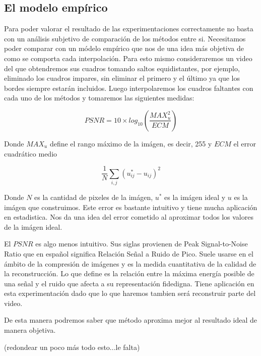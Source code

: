 \subsection{El modelo empírico}

Para poder valorar el resultado de las experimentaciones correctamente no basta con un análisis subjetivo de comparación de los métodos entre si. Necesitamos poder comparar con un módelo empírico que nos de una idea más objetiva de como se comporta cada interpolación. Para esto mismo consideraremos un video del que obtendremos sus cuadros tomando saltos equidistantes, por ejemplo, eliminado los cuadros impares, sin eliminar el primero y el último ya que los bordes siempre estarán incluidos. Luego interpolaremos los cuadros faltantes con cada uno de los métodos y tomaremos las siguientes medidas:

\begin{equation}
	PSNR = 10 \times log_{10}(\dfrac{MAX_u^2}{ECM})
\end{equation}

Donde $MAX_u$ define el rango máximo de la imágen, es decir, 255 y $ECM$ el error cuadrático medio

\begin{equation}
	\dfrac{1}{N}\sum_{i,j}(u_{ij}^* - u_{ij})^2
\end{equation}

Donde $N$ es la cantidad de pixeles de la imágen, $u^*$ es la imágen ideal y $u$ es la imágen que construimos. Este error es bastante intuitivo y tiene mucha aplicación en estadistica. Nos da una idea del error cometido al aproximar todos los valores de la imágen ideal. 

El $PSNR$ es algo menos intuitivo. Sus siglas provienen de Peak Signal-to-Noise Ratio que en español significa Relación Señal a Ruido de Pico. Suele usarse en el ámbito de la compresión de imágenes y es la medida cuantitativa de la calidad de la reconstrucción. Lo que define es la relación entre la máxima energía posible de una señal y el ruido que afecta a su representación fidedigna. 
Tiene aplicación en esta experimentación dado que lo que haremos tambien será reconstruir parte del video.

De esta manera podremos saber que método aproxima mejor al resultado ideal de manera objetiva. 

(redondear un poco más todo esto...le falta)











